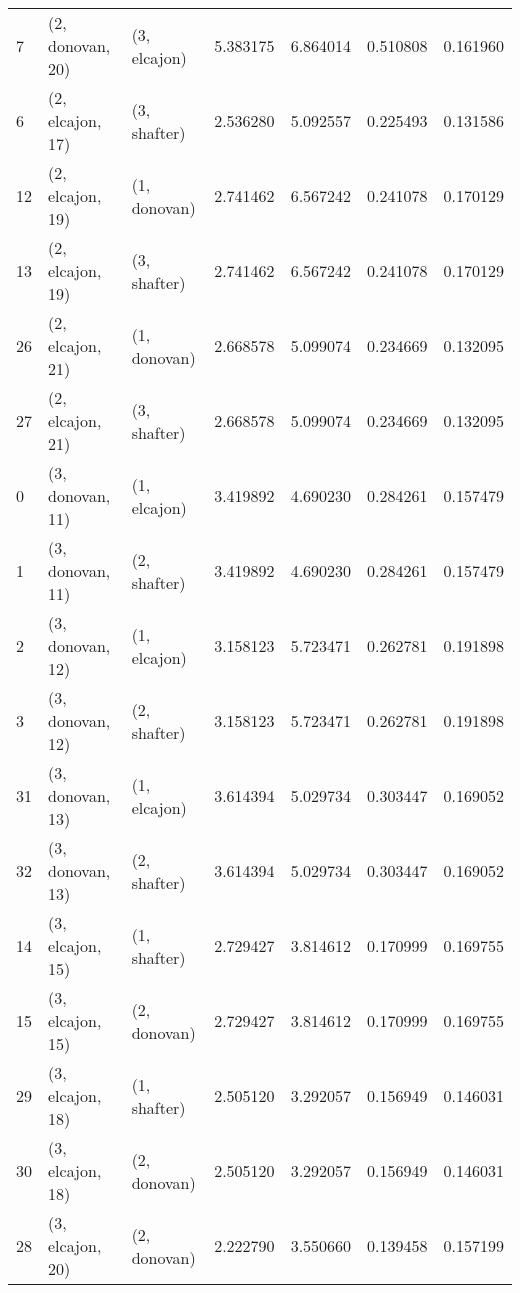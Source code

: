 \begin{tabular}{lllrrrr}
7  &  (2, donovan, 20) &     (3, elcajon) &  5.383175 &  6.864014 &   0.510808 &  0.161960 \\
6  &  (2, elcajon, 17) &     (3, shafter) &  2.536280 &  5.092557 &   0.225493 &  0.131586 \\
12 &  (2, elcajon, 19) &     (1, donovan) &  2.741462 &  6.567242 &   0.241078 &  0.170129 \\
13 &  (2, elcajon, 19) &     (3, shafter) &  2.741462 &  6.567242 &   0.241078 &  0.170129 \\
26 &  (2, elcajon, 21) &     (1, donovan) &  2.668578 &  5.099074 &   0.234669 &  0.132095 \\
27 &  (2, elcajon, 21) &     (3, shafter) &  2.668578 &  5.099074 &   0.234669 &  0.132095 \\
0  &  (3, donovan, 11) &     (1, elcajon) &  3.419892 &  4.690230 &   0.284261 &  0.157479 \\
1  &  (3, donovan, 11) &     (2, shafter) &  3.419892 &  4.690230 &   0.284261 &  0.157479 \\
2  &  (3, donovan, 12) &     (1, elcajon) &  3.158123 &  5.723471 &   0.262781 &  0.191898 \\
3  &  (3, donovan, 12) &     (2, shafter) &  3.158123 &  5.723471 &   0.262781 &  0.191898 \\
31 &  (3, donovan, 13) &     (1, elcajon) &  3.614394 &  5.029734 &   0.303447 &  0.169052 \\
32 &  (3, donovan, 13) &     (2, shafter) &  3.614394 &  5.029734 &   0.303447 &  0.169052 \\
14 &  (3, elcajon, 15) &     (1, shafter) &  2.729427 &  3.814612 &   0.170999 &  0.169755 \\
15 &  (3, elcajon, 15) &     (2, donovan) &  2.729427 &  3.814612 &   0.170999 &  0.169755 \\
29 &  (3, elcajon, 18) &     (1, shafter) &  2.505120 &  3.292057 &   0.156949 &  0.146031 \\
30 &  (3, elcajon, 18) &     (2, donovan) &  2.505120 &  3.292057 &   0.156949 &  0.146031 \\
28 &  (3, elcajon, 20) &     (2, donovan) &  2.222790 &  3.550660 &   0.139458 &  0.157199 \\
\bottomrule
\end{tabular}
